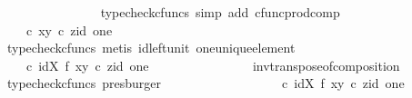 \begin{isabellebody}
\ \ \ \ \ \ \ \ \ \ \ \ \ \ \isamarkupfalse%
\ {\isacharparenleft}{\kern0pt}typecheck{\isacharunderscore}{\kern0pt}cfuncs{\isacharcomma}{\kern0pt}\ simp\ add{\isacharcolon}{\kern0pt}\ cfunc{\isacharunderscore}{\kern0pt}prod{\isacharunderscore}{\kern0pt}comp{\isacharparenright}{\kern0pt}\isanewline
\ \ \ \ \ \ \ \ \ \ \ \ \isamarkupfalse%
\ \isamarkupfalse%
\ {\isachardoublequoteopen}{\isachardot}{\kern0pt}{\isachardot}{\kern0pt}{\isachardot}{\kern0pt}\ {\isacharequal}{\kern0pt}\ {\isacharparenleft}{\kern0pt}{\isasymTheta}\ {\isasymcirc}\isactrlsub c\ {\isasymlangle}x{\isacharcomma}{\kern0pt}y{\isasymrangle}{\isacharparenright}{\kern0pt}\isactrlsup {\isasymflat}\ {\isasymcirc}\isactrlsub c\ {\isasymlangle}z{\isacharcomma}{\kern0pt}id\ one{\isasymrangle}{\isachardoublequoteclose}\isanewline
\ \ \ \ \ \ \ \ \ \ \ \ \ \ \isamarkupfalse%
\ {\isacharparenleft}{\kern0pt}typecheck{\isacharunderscore}{\kern0pt}cfuncs{\isacharcomma}{\kern0pt}\ metis\ id{\isacharunderscore}{\kern0pt}left{\isacharunderscore}{\kern0pt}unit{}\ one{\isacharunderscore}{\kern0pt}unique{\isacharunderscore}{\kern0pt}element{\isacharparenright}{\kern0pt}\isanewline
\ \ \ \ \ \ \ \ \ \ \ \ \isamarkupfalse%
\ \isamarkupfalse%
\ {\isachardoublequoteopen}{\isachardot}{\kern0pt}{\isachardot}{\kern0pt}{\isachardot}{\kern0pt}\ {\isacharequal}{\kern0pt}\ {\isacharparenleft}{\kern0pt}{\isasymTheta}\isactrlsup {\isasymflat}\ {\isasymcirc}\isactrlsub c\ {\isacharparenleft}{\kern0pt}id{\isacharparenleft}{\kern0pt}X{\isacharparenright}{\kern0pt}\ {\isasymtimes}\isactrlsub f\ {\isasymlangle}x{\isacharcomma}{\kern0pt}y{\isasymrangle}{\isacharparenright}{\kern0pt}{\isacharparenright}{\kern0pt}\ {\isasymcirc}\isactrlsub c\ {\isasymlangle}z{\isacharcomma}{\kern0pt}id\ one{\isasymrangle}{\isachardoublequoteclose}\isanewline
\ \ \ \ \ \ \ \ \ \ \ \ \ \ \isamarkupfalse%
\ inv{\isacharunderscore}{\kern0pt}transpose{\isacharunderscore}{\kern0pt}of{\isacharunderscore}{\kern0pt}composition\ \isamarkupfalse%
\ {\isacharparenleft}{\kern0pt}typecheck{\isacharunderscore}{\kern0pt}cfuncs{\isacharcomma}{\kern0pt}\ presburger{\isacharparenright}{\kern0pt}\isanewline
\ \ \ \ \ \ \ \ \ \ \ \ \isamarkupfalse%
\ \isamarkupfalse%
\ {\isachardoublequoteopen}{\isachardot}{\kern0pt}{\isachardot}{\kern0pt}{\isachardot}{\kern0pt}\ {\isacharequal}{\kern0pt}\ {\isasymTheta}\isactrlsup {\isasymflat}\ {\isasymcirc}\isactrlsub c\ {\isacharparenleft}{\kern0pt}id{\isacharparenleft}{\kern0pt}X{\isacharparenright}{\kern0pt}\ {\isasymtimes}\isactrlsub f\ {\isasymlangle}x{\isacharcomma}{\kern0pt}y{\isasymrangle}{\isacharparenright}{\kern0pt}\ {\isasymcirc}\isactrlsub c\ {\isasymlangle}z{\isacharcomma}{\kern0pt}id\ one{\isasymrangle}{\isachardoublequoteclose}\isanewline

\end{isabellebody}
